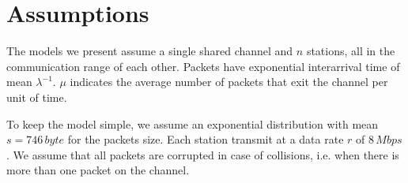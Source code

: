 \section{Assumptions}
\label{sec:assumptions}

The models we present assume a single shared channel and $n$ stations, all in the communication range of each other.
Packets have exponential interarrival time of mean $\lambda^{-1}$.
$\mu$ indicates the average number of packets that exit the channel per unit of time.

To keep the model simple, we assume an exponential distribution with mean $s=746\, byte$ for the packets size.
Each station transmit at a data rate $r$ of $8\, Mbps$.
We assume that all packets are corrupted in case of collisions, i.e. when there is more than one packet on the channel.
